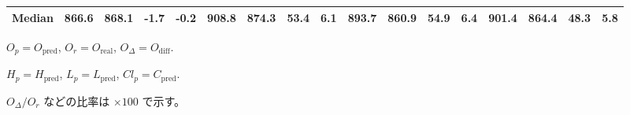 \begin{threeparttable}
{\begin{tabular}{lrrrrrrrrrrrrrrrr}
 Median & 866.6 & 868.1 &       -1.7 &           -0.2 &  908.8 & 874.3 &       53.4 &            6.1 &  893.7 & 860.9 &       54.9 &            6.4 &  901.4 &  864.4 &        48.3 &              5.8 \\
\bottomrule
\end{tabular}
}
\begin{tablenotes}\footnotesize
\item $O_p=O_{\text{pred}}$, $O_r=O_{\text{real}}$, $O_\Delta=O_{\text{diff}}$.
\item $H_p=H_{\text{pred}}$, $L_p=L_{\text{pred}}$, $Cl_p=C_{\text{pred}}$.
\item $O_\Delta/O_r$ などの比率は \(\times100\) で示す。
\end{tablenotes}
\end{threeparttable}
\endgroup
